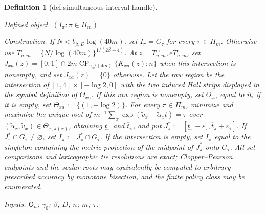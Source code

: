 \documentclass{article}
\newtheorem{definition}{Definition}
\begin{document}
\begin{definition}[def:simultaneous-interval-handle]\label{def:simultaneous-interval-handle}
\par\smallskip\noindent\emph{Defined object.} \((I_{\pi}:\pi\in\Pi_m)\)
\par\smallskip\noindent\emph{Construction.} If \(N<b_{\beta,D}\log(40m)\), set \(I_{\pi}=G_{\tau}\) for every \(\pi\in\Pi_m\). Otherwise use \(T^{\mathrm{ci}}_{n,m}=\{N/\log(40m)\}^{1/(2\beta+4)}\). At \(z=T^{\mathrm{ci}}_{n,m},eT^{\mathrm{ci}}_{n,m}\), set \(J_{xa}(z)=[0,1]\cap 2m\operatorname{CP}_{\gamma_0/(4m)}\{K_{xa}(z);n\}\) when this intersection is nonempty, and set \(J_{xa}(z)=\{0\}\) otherwise. Let the raw region be the intersection of \([1,4]\times[-\log2,0]\) with the two induced Hall strips displayed in the symbol definition of \(\Theta_{xa}\). If this raw region is nonempty, set \(\Theta_{xa}\) equal to it; if it is empty, set \(\Theta_{xa}:=\{(1,-\log2)\}\). For every \(\pi\in\Pi_m\), minimize and maximize the unique root of \(m^{-1}\sum_x\exp(\widetilde v_x-\widetilde\alpha_xt)=\tau\) over \((\widetilde\alpha_x,\widetilde v_x)\in\Theta_{x,\pi(x)}\), obtaining \(\underline t_{\pi}\) and \(\overline t_{\pi}\), and put \(J^*_{\pi}:=[\underline t_{\pi}-\varepsilon_{\tau},\overline t_{\pi}+\varepsilon_{\tau}]\). If \(J^*_{\pi}\cap G_{\tau}\neq\varnothing\), set \(I_{\pi}:=J^*_{\pi}\cap G_{\tau}\). If the intersection is empty, set \(I_{\pi}\) equal to the singleton containing the metric projection of the midpoint of \(J^*_{\pi}\) onto \(G_{\tau}\). All set comparisons and lexicographic tie resolutions are exact; Clopper--Pearson endpoints and the scalar roots may equivalently be computed to arbitrary prescribed accuracy by monotone bisection, and the finite policy class may be enumerated.
\par\smallskip\noindent\emph{Inputs.} \(\mathsf O_n\); \(\gamma_0\); \(\beta\); \(D\); \(n\); \(m\); \(\tau\).
\end{definition}
\end{document}
